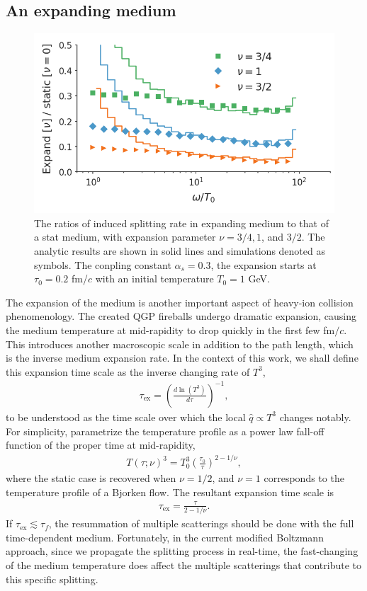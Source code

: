 \documentclass[aps, prc, reprint, amsmath, groupedaddress, nofootinbib]{revtex4-1}
\begin{document}
\subsection{An expanding medium}
\begin{figure}
\includegraphics[width=\columnwidth]{spectrum_Bjorken.png}
\caption{The ratios of induced splitting rate in expanding medium to that of a stat medium, with expansion parameter $\nu = 3/4, 1$, and $3/2$. The analytic results are shown in solid lines and simulations denoted as symbols. The conpling constant $\alpha_s=0.3$, the expansion starts at $\tau_0 = 0.2$ fm/$c$ with an initial temperature $T_0 = 1$ GeV.}
\label{fig:Bjorken-BDMPS}
\end{figure}

The expansion of the medium is another important aspect of heavy-ion collision phenomenology.
The created QGP fireballs undergo dramatic expansion, causing the medium temperature at mid-rapidity to drop quickly in the first few fm$/c$.
This introduces another macroscopic scale in addition to the path length, which is the inverse medium expansion rate. 
In the context of this work, we shall define this expansion time scale as the inverse changing rate of $T^3$,
\begin{eqnarray}
\tau_{\textrm{ex}} = \left(\frac{d\ln(T^3)}{d \tau} \right)^{-1},
\end{eqnarray}
to be understood as the time scale over which the local $\hat{q}\propto T^3$ changes notably.
For simplicity, parametrize the temperature profile as a power law fall-off function of the proper time at mid-rapidity,
\begin{eqnarray}
T(\tau; \nu)^3 = T_0^3\left(\frac{\tau_0}{\tau}\right)^{2-1/\nu},
\label{eq:temperature}
\end{eqnarray}
where the static case is recovered when $\nu=1/2$, and $\nu=1$ corresponds to the temperature profile of a Bjorken flow.
The resultant expansion time scale is
\begin{eqnarray}
\tau_{\textrm{ex}} = \frac{\tau}{2-1/\nu}.
\end{eqnarray}
If $\tau_{\textrm{ex}} \lesssim \tau_f$, the resummation of multiple scatterings should be done with the full time-dependent medium.
Fortunately, in the current modified Boltzmann approach, since we propagate the splitting process in real-time, the fast-changing of the medium temperature does affect the multiple scatterings that contribute to this specific splitting.
\end{document}

